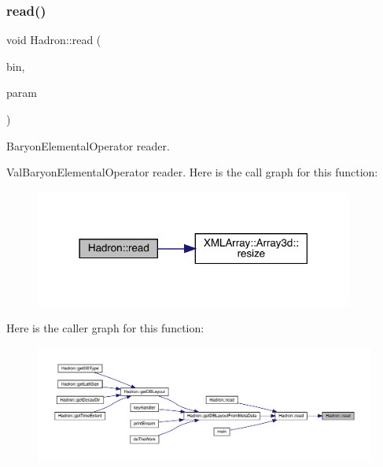 \subsubsection{\texorpdfstring{read()}{read()}\hspace{0.1cm}{\footnotesize\ttfamily [64/94]}}
{\footnotesize\ttfamily void Hadron\+::read (\begin{DoxyParamCaption}\item[{\mbox{\hyperlink{classADATIO_1_1BinaryReader}{Binary\+Reader}} \&}]{bin,  }\item[{\mbox{\hyperlink{structHadron_1_1ValBaryonElementalOperator__t}{Val\+Baryon\+Elemental\+Operator\+\_\+t}} \&}]{param }\end{DoxyParamCaption})}



Baryon\+Elemental\+Operator reader. 

Val\+Baryon\+Elemental\+Operator reader. Here is the call graph for this function\+:
\nopagebreak
\begin{figure}[H]
\begin{center}
\leavevmode
\includegraphics[width=297pt]{d1/daf/namespaceHadron_ae87d364dcd64ddf5c60a1b4d6237e633_cgraph}
\end{center}
\end{figure}
Here is the caller graph for this function\+:
\nopagebreak
\begin{figure}[H]
\begin{center}
\leavevmode
\includegraphics[width=350pt]{d1/daf/namespaceHadron_ae87d364dcd64ddf5c60a1b4d6237e633_icgraph}
\end{center}
\end{figure}
\mbox{\label{namespaceHadron_a9991ac06f4136479286a214307cd17dc}} 
